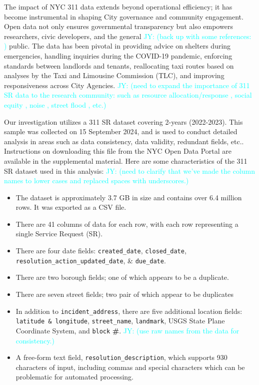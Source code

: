 \documentclass[linenumber]{jdsart}
\newcommand{\jy}[1]{\textcolor{cyan}{JY: (#1)}}
\begin{document}
The impact of NYC 311 data extends beyond operational efficiency; it
has become instrumental in shaping City governance and community
engagement. Open data not only ensures governmental transparency
but also empowers researchers, civic developers, and the general
\jy{back up with some references:
  \citep{minkoff2016nyc, o2017uncharted, kontokosta2021bias}}
public. The data has been pivotal in providing advice on shelters
during emergencies, handling inquiries during the COVID\mbox{-}19 pandemic,
enforcing standards between landlords and tenants, reallocating taxi
routes based on analyses by the Taxi and Limousine Commission (TLC),
and improving responsiveness across City Agencies.
\jy{need to expand the importance of 311 SR data to the research
  community: such as
  resource allocation/response \citep{zha2014profiling, raj2021swift},
  social equity \citep{white2018promises, kontokosta2021bias},
  noise \citep{dove2022sounds},
  street flood \citep{agonafir2022understanding}, etc.}
  


Our investigation utilizes a 311 SR dataset covering  2\mbox{-}years (2022-2023).
This sample was collected on 15 September 2024, and is used 
to conduct detailed analysis in areas such as data 
consistency, data validity, redundant fields, etc.. Instructions 
on downloading this file from the NYC Open Data Portal 
are available in the supplemental material. Here are some 
characteristics of the 311 SR dataset used in this analysis:
\jy{need to clarify that we've made the column names to lower cases
  and replaced spaces with underscores.}
\begin{itemize}[left=1.5em]
\item The dataset is approximately 3.7 GB in size and contains 
  over 6.4 million rows. It was exported as a CSV file.

\item There are 41 columns of data for each row, with each
  row representing a single Service Request (SR). 
	
\item There are four date fields: \texttt{created\_date}, \texttt{closed\_date}, 
  \texttt{resolution\_action\_updated\_date}, \& \texttt{due\_date}.
	
\item There are two borough fields; one of which appears to be a duplicate.
  
\item There are seven street fields; two pair of which appear to be duplicates
          
\item In addition to  \texttt{incident\_address}, there are five additional location fields: 
  \texttt{latitude \& longitude}, \texttt{street\_name}, \texttt{landmark}, USGS State Plane 
  Coordinate System, and \texttt{block} \textbf{\#}.
  \jy{use raw names from the data for consistency.}
	
\item A free\mbox{-}form text field, \texttt{resolution\_description}, which 
  supports 930 characters of input, including commas and 
  special characters  which can be problematic for automated processing.
\end{itemize}
\end{document}
